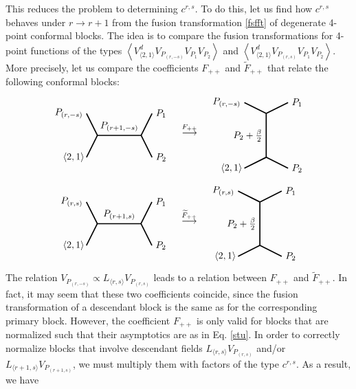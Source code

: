 \documentclass[12pt, a4paper]{article}
\theoremstyle{break}
\begin{document}
This reduces the problem to determining $c^{r,s}$. To do this, let us find how $c^{r,s}$ behaves under $r\to r+1$ from the fusion transformation \eqref{fsfft} of degenerate 4-point conformal blocks. The idea is to compare the fusion transformations for 4-point functions of the types $\left<V^d_{\langle 2,1\rangle}V_{P_{(r,-s)}}V_{P_1}V_{P_2}\right>$ and $\left<V^d_{\langle 2,1\rangle}V_{P_{(r,s)}}V_{P_1}V_{P_2}\right>$. More precisely, let us compare the coefficients $F_{++}$ and $\widetilde{F}_{++}$ that relate the following conformal blocks:
\begin{align}
  \begin{tikzpicture}[baseline=(current  bounding  box.center), very thick, scale = .4]
\draw (-1,2) node [left] {$P_{(r,-s)}$} -- (0,0) -- node [above] {$P_{(r+1,-s)}$} (4,0) -- (5,2) node [right] {$P_1$};
\draw (-1,-2) node [left] {$\langle 2,1\rangle\!$} -- (0,0);
\draw (4,0) -- (5,-2) node [right] {$P_2$};
\end{tikzpicture}
\quad \overset{F_{++}}{\longrightarrow} \quad 
\begin{tikzpicture}[baseline=(current  bounding  box.center), very thick, scale = .4]
 \draw (-2,3) node [left] {$P_{(r,-s)}$} -- (0,2) -- node [left] {$P_2+\frac{\beta}{2}$} (0,-2) -- (-2, -3) node [left] {$\langle 2,1\rangle\!$};
\draw (0,2) -- (2,3) node [right] {$P_1$};
\draw (0,-2) -- (2, -3) node [right] {$P_2$};
\end{tikzpicture}
\end{align}
\begin{align}
\begin{tikzpicture}[baseline=(current  bounding  box.center), very thick, scale = .4]
\draw (-1,2) node [left] {$P_{(r,s)}$} -- (0,0) -- node [above] {$P_{(r+1,s)}$} (4,0) -- (5,2) node [right] {$P_1$};
\draw (-1,-2) node [left] {$\langle 2,1\rangle\!$} -- (0,0);
\draw (4,0) -- (5,-2) node [right] {$P_2$};
\end{tikzpicture}
\quad \overset{\widetilde{F}_{++}}{\longrightarrow} \quad 
\begin{tikzpicture}[baseline=(current  bounding  box.center), very thick, scale = .4]
 \draw (-2,3) node [left] {$P_{(r,s)}$} -- (0,2) -- node [left] {$P_2+\frac{\beta}{2}$} (0,-2) -- (-2, -3) node [left] {$\langle 2,1\rangle\!$};
\draw (0,2) -- (2,3) node [right] {$P_1$};
\draw (0,-2) -- (2, -3) node [right] {$P_2$};
\end{tikzpicture}
\end{align}
The relation $V_{P_{(r,-s)}}\propto L_{\langle r,s\rangle}V_{P_{(r,s)}}$ leads to a relation between $F_{++}$ and $\widetilde{F}_{++}$. In fact, it may seem that these two coefficients coincide, since the fusion transformation of a descendant block is the same as for the corresponding primary block. However, the coefficient $F_{++}$ is only valid for blocks that are normalized such that their asymptotics are as in Eq. \eqref{stu}. In order to correctly normalize blocks that involve descendant fields $L_{\langle r,s\rangle}V_{P_{(r,s)}}$ and/or $L_{\langle r+1,s\rangle}V_{P_{(r+1,s)}}$, we must multiply them with factors of the type $c^{r,s}$. As a result, we have 
\end{document}

